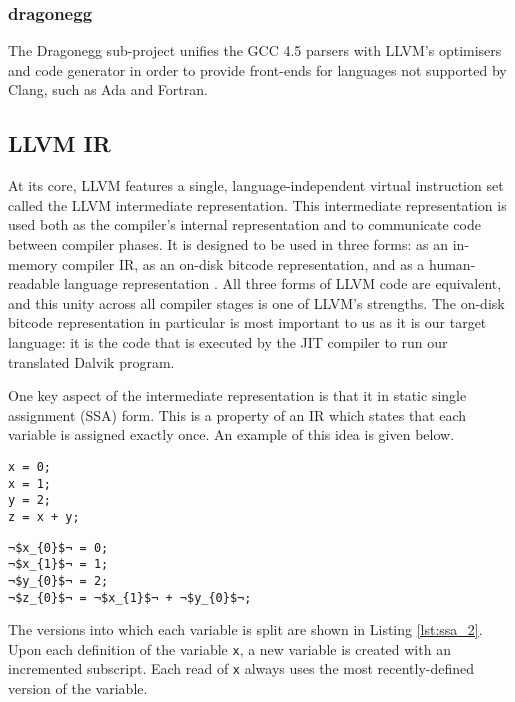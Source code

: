 \subsubsection*{dragonegg}

The Dragonegg sub-project unifies the GCC 4.5 parsers with LLVM's optimisers and code generator in order to provide front-ends for languages not supported by Clang, such as Ada and Fortran.

\subsection*{LLVM IR}

At its core, LLVM features a single, language-independent virtual instruction set called the LLVM intermediate representation. This intermediate representation is used both as the compiler's internal representation and to communicate code between compiler phases. It is designed to be used in three forms: as an in-memory compiler IR, as an on-disk bitcode representation, and as a human-readable language representation \cite{llvm_ref}. All three forms of LLVM code are equivalent, and this unity across all compiler stages is one of LLVM's strengths. The on-disk bitcode representation in particular is most important to us as it is our target language: it is the code that is executed by the JIT compiler to run our translated Dalvik program.

One key aspect of the intermediate representation is that it in static single assignment (SSA) form. This is a property of an IR which states that each variable is assigned exactly once. An example of this idea is given below.

\lstset{
	language=C,
	basicstyle=\small,
	stringstyle=\ttfamily
}

\begin{lstlisting}[frame=single, caption={Code for SSA example}, label=lst:ssa_1]
x = 0;
x = 1;
y = 2;
z = x + y;
\end{lstlisting}


\begin{lstlisting}[frame=single, escapechar={¬}, caption={Example of SSA form}, label=lst:ssa_2]
¬$x_{0}$¬ = 0;
¬$x_{1}$¬ = 1;
¬$y_{0}$¬ = 2;
¬$z_{0}$¬ = ¬$x_{1}$¬ + ¬$y_{0}$¬;
\end{lstlisting}

The versions into which each variable is split are shown in Listing \ref{lst:ssa_2}. Upon each definition of the variable \verb|x|, a new variable is created with an incremented subscript. Each read of \verb|x| always uses the most recently-defined version of the variable.


